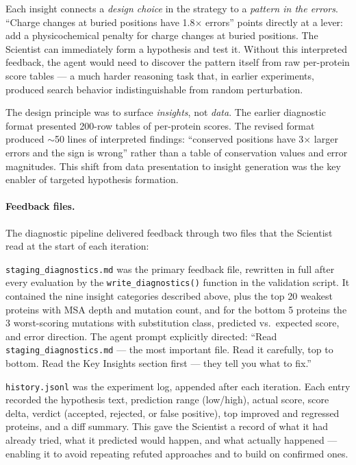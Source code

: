 \documentclass[11pt,a4paper]{article}
\begin{document}
Each insight connects a \emph{design choice} in the strategy to a \emph{pattern in the errors}. ``Charge changes at buried positions have 1.8$\times$ errors'' points directly at a lever: add a physicochemical penalty for charge changes at buried positions. The Scientist can immediately form a hypothesis and test it. Without this interpreted feedback, the agent would need to discover the pattern itself from raw per-protein score tables --- a much harder reasoning task that, in earlier experiments, produced search behavior indistinguishable from random perturbation.

The design principle was to surface \emph{insights}, not \emph{data}. The earlier diagnostic format presented 200-row tables of per-protein scores. The revised format produced $\sim$50 lines of interpreted findings: ``conserved positions have 3$\times$ larger errors and the sign is wrong'' rather than a table of conservation values and error magnitudes. This shift from data presentation to insight generation was the key enabler of targeted hypothesis formation.

\paragraph{Feedback files.}
The diagnostic pipeline delivered feedback through two files that the Scientist read at the start of each iteration:

\texttt{staging\_diagnostics.md} was the primary feedback file, rewritten in full after every evaluation by the \texttt{write\_diagnostics()} function in the validation script. It contained the nine insight categories described above, plus the top 20 weakest proteins with MSA depth and mutation count, and for the bottom 5 proteins the 3 worst-scoring mutations with substitution class, predicted vs.\ expected score, and error direction. The agent prompt explicitly directed: ``Read \texttt{staging\_diagnostics.md} --- the most important file. Read it carefully, top to bottom. Read the Key Insights section first --- they tell you what to fix.''

\texttt{history.jsonl} was the experiment log, appended after each iteration. Each entry recorded the hypothesis text, prediction range (low/high), actual score, score delta, verdict (accepted, rejected, or false positive), top improved and regressed proteins, and a diff summary. This gave the Scientist a record of what it had already tried, what it predicted would happen, and what actually happened --- enabling it to avoid repeating refuted approaches and to build on confirmed ones.
\end{document}

